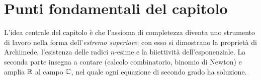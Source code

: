 \section{Punti fondamentali del capitolo}
\label{sec:sintesi-cap02}

L'idea centrale del capitolo è che l'assioma di completezza diventa uno strumento di
lavoro nella forma dell'\emph{estremo superiore}: con esso si dimostrano la proprietà di
Archimede, l'esistenza delle radici $n$-esime e la biiettività dell'esponenziale. La
seconda parte insegna a contare (calcolo combinatorio, binomio di Newton) e amplia $\mathbb{R}$
al campo $\mathbb{C}$, nel quale ogni equazione di secondo grado ha soluzione.

